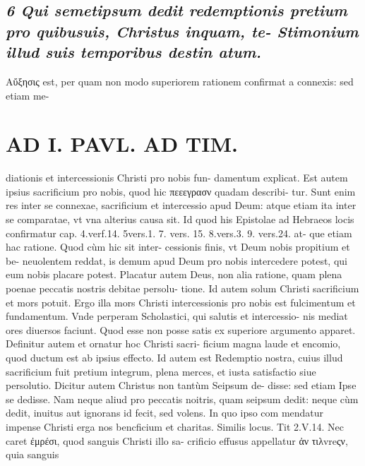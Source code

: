 \documentclass{article}
\begin{document}
\begin{pages}
\subsection*{\textit{6 Qui semetipsum dedit redemptionis pretium pro quibusuis, Christus inquam, te- Stimonium illud suis temporibus destin atum. }}\pstart Αὔξησις est, per quam non modo superiorem rationem confirmat a connexis: sed etiam me-  \pend
\section*{AD I. PAVL. AD TIM. }
\marginpar{[ p.oo ]}\pstart diationis et intercessionis Christi pro nobis fun- damentum explicat. Est autem ipsius sacrificium pro nobis, quod hic πεεεγρασν quadam describi- tur. Sunt enim res inter se connexae, sacrificium et intercessio apud Deum: atque etiam ita inter se comparatae, vt vna alterius causa sit. Id quod his Epistolae ad Hebraeos locis confirmatur cap. 4.verf.14. 5vers.1. 7. vers. 15. 8.vers.3. 9. vers.24. at- que etiam hac ratione. Quod cùm hic sit inter- cessionis finis, vt Deum nobis propitium et be- neuolentem reddat, is demum apud Deum pro nobis intercedere potest, qui eum nobis placare potest. Placatur autem Deus, non alia ratione, quam plena poenae peccatis nostris debitae persolu- tione. Id autem solum Christi sacrificium et mors potuit. Ergo illa mors Christi intercessionis pro nobis est fulcimentum et fundamentum. Vnde perperam Scholastici, qui salutis et intercessio- nis mediat ores diuersos faciunt. Quod esse non posse satis ex superiore argumento apparet.  \pend\pstart Definitur autem et ornatur hoc Christi sacri- ficium magna laude et encomio, quod ductum est ab ipsius effecto. Id autem est Redemptio nostra, cuius illud sacrificium fuit pretium integrum, plena merces, et iusta satisfactio siue persolutio. Dicitur autem Christus non tantùm Seipsum de- disse: sed etiam Ipse se dedisse. Nam neque  aliud pro peccatis noitris, quam seipsum dedit: neque cùm dedit, inuitus aut ignorans id fecit, sed volens. In quo ipso com mendatur impense Christi erga nos bencficium et charitas. Similis locus. Tit 2.V.14.  \pend\pstart Nec caret ἐμρέσι, quod sanguis Christi illo sa- crificio effusus appellatur ἀν τιλvreςν, quia sanguis  \pend

\end{pages}
\end{document}
